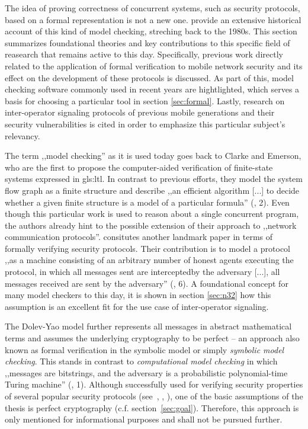 The idea of proving correctness of concurrent systems, such as security protocols, based on a formal representation is not a new one.
\cite{basin2018model} provide an extensive historical account of this kind of model checking, streching back to the 1980s.
This section summarizes foundational theories and key contributions to this specific field of reasearch that remains active to this day.
Specifically, previous work directly related to the application of formal verification to mobile network security and its effect on the development of these protocols is discussed.
As part of this, model checking software commonly used in recent years are hightlighted, which serves a basis for choosing a particular tool in section \ref{sec:formal}.
Lastly, research on inter-operator signaling protocols of previous mobile generations and their security vulnerabilities is cited in order to emphasize this particular subject's relevancy.

The term ,,model checking'' as it is used today goes back to Clarke and Emerson, who are the first to propose the computer-aided verification of finite-state systems expressed in \gls{gls:ltl}.
In contrast to previous efforts, they model the system flow graph as a finite structure and describe ,,an efficient algorithm [...] to decide whether a given finite structure is a model of a particular formula'' (\cite{clarke1981design}, 2).
Even though this particular work is used to reason about a single concurrent program, the authors already hint to the possible extension of their approach to ,,network communication protocols''.
\cite{dolev1983security} consitutes another landmark paper in terms of formally verifying security protocols.
Their contribution is to model a protocol ,,as a machine consisting of an arbitrary number of honest agents executing the protocol, in which all messages sent are interceptedby the adversary [...], all messages received are sent by the adversary'' (\cite{basin2018model}, 6).
A foundational concept for many model checkers to this day, it is shown in section \ref{sec:n32} how this assumption is an excellent fit for the use case of inter-operator signaling.

The Dolev-Yao model further represents all messages in abstract mathematical terms and assumes the underlying cryptography to be perfect -- an approach also known as formal verification in the symbolic model or simply \textit{symbolic model checking}.
This stands in contrast to \textit{computational model checking} in which ,,messages are bitstrings, and the adversary is a probabilistic polynomial-time Turing machine'' (\cite{blanchet2008computationally}, 1).
Although successfully used for verifying security properties of several popular security protocols (see~\cite{BlanchetJaggardScedrovTsayAsiaCCS08}, \cite{CadeBlanchetJoWUA13}, \cite{LippBlanchetBhargavanEuroSP19}), one of the basic assumptions of the thesis is perfect cryptography (c.f. section~\ref{sec:goal}).
Therefore, this approach is only mentioned for informational purposes and shall not be pursued further.

